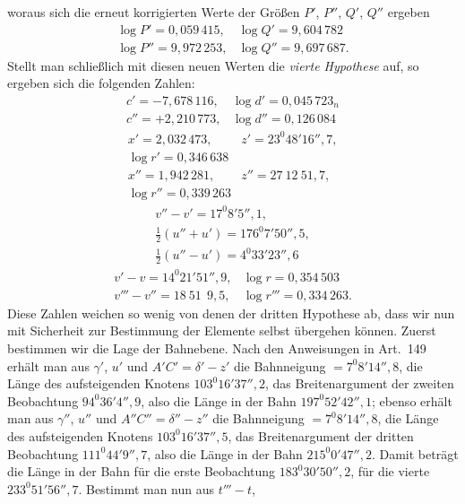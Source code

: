 woraus sich die erneut korrigierten Werte der Größen $P'$, $P''$, $Q'$, $Q''$ ergeben
\[
\begin{array}{ll}
\log P' = 0{,}059\,415, & \log Q' = 9{,}604\,782 \\
\log P'' = 9{,}972\,253, & \log Q'' = 9{,}697\,687.
\end{array}
\]
Stellt man schließlich mit diesen neuen Werten die \emph{vierte Hypothese} auf, so ergeben sich
die folgenden Zahlen:
\[
\begin{array}{ll}
c' = -7{,}678\,116, & \log d' = 0{,}045\,723_n \\
c'' = +2{,}210\,773, & \log d'' = 0{,}126\,084
\end{array}
\]
\[
\begin{array}{ll}
x' = 2{,}032\,473, & z' = 23^{0}48'16''{,}7,\\
\log r' = 0{,}346\,638 & \\
x'' = 1{,}942\,281, & z'' = 27\ 12\ 51{,}7,\\
\log r'' = 0{,}339\,263 & 
\end{array}
\]
\[
\begin{gathered}
v''-v' = 17^{0}8'5''{,}1, \\ \tfrac{1}{2}(u''+u') = 176^{0}7'50''{,}5, \\
\tfrac{1}{2}(u''-u') = 4^{0}33'23''{,}6
\end{gathered}
\]
\[
\begin{array}{ll}
v'-v = 14^{0}21'51''{,}9, & \log r = 0{,}354\,503 \\
v'''-v'' = 18\ 51\ \ 9{,}5, & \log r''' = 0{,}334\,263.
\end{array}
\]
Diese Zahlen weichen so wenig von denen der dritten Hypothese ab,
dass wir nun mit Sicherheit zur Bestimmung der Elemente selbst übergehen
können. Zuerst bestimmen wir die Lage der Bahnebene. Nach den Anweisungen in Art.\ 149
erhält man aus $\gamma'$, $u'$ und $A'C' = \delta'-z'$ die Bahnneigung
$= 7^{0}8'14''{,}8$, die Länge des aufsteigenden Knotens $103^{0}16'37''{,}2$, das Breitenargument
der zweiten Beobachtung $94^{0}36'4''{,}9$, also die Länge in der Bahn $197^{0}52'42''{,}1$; ebenso erhält man aus $\gamma''$, $u''$
und $A''C'' = \delta''-z''$ die Bahnneigung $= 7^{0}8'14''{,}8$,
die Länge des aufsteigenden Knotens $103^{0}16'37''{,}5$, das Breitenargument
der dritten Beobachtung $111^{0}44'9''{,}7$, also die Länge in der Bahn
$215^{0}0'47''{,}2$. Damit beträgt die Länge in der Bahn für die erste Beobachtung
$183^{0}30'50''{,}2$, für die vierte $233^{0}51'56''{,}7$. Bestimmt man nun aus $t'''-t$,
